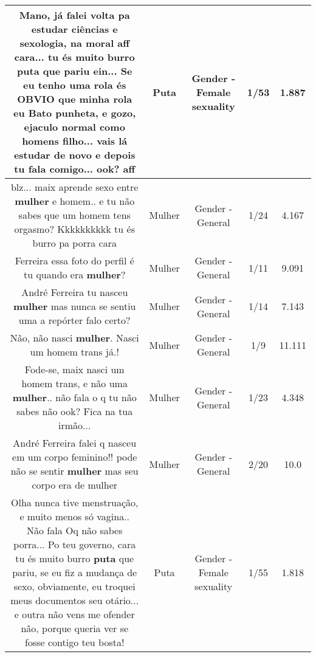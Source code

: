 \documentclass[11pt]{article}
\newlength\mylength
\begin{document}
\begin{center}
\begin{longtable}{|C{.65\mylength}|C{.30\mylength}|C{.12\mylength}|C{.12\mylength}|C{.12\mylength}|}
  \small Mano, já falei volta pa estudar ciências e sexologia, na moral aff cara... tu és muito burro \textbf{puta} que pariu ein... Se eu tenho uma rola és OBVIO que minha rola eu Bato punheta, e gozo, ejaculo normal como homens filho... vais lá estudar de novo e depois tu fala comigo... ook? aff\normalsize   & Puta & Gender - Female sexuality & 1/53 & 1.887 \\  \hline
  \small blz... maix aprende sexo entre \textbf{mulher} e homem..  e tu não sabes que um homem tens orgasmo? Kkkkkkkkkk tu és burro pa porra cara\normalsize   & Mulher & Gender - General & 1/24 & 4.167 \\  \hline
  \small {} Ferreira essa foto do perfil é tu quando era \textbf{mulher}?\normalsize   & Mulher & Gender - General & 1/11 & 9.091 \\  \hline
  \small André Ferreira tu nasceu \textbf{mulher} mas nunca se sentiu uma a repórter falo certo?\normalsize   & Mulher & Gender - General & 1/14 & 7.143 \\  \hline
  \small Não, não nasci \textbf{mulher}. Nasci um homem trans já.!\normalsize   & Mulher & Gender - General & 1/9 & 11.111 \\  \hline
  \small Fode-se, maix nasci um homem trans,  e não uma \textbf{mulher}.. não fala o q tu não sabes não ook? Fica na tua irmão...\normalsize   & Mulher & Gender - General & 1/23 & 4.348 \\  \hline
  \small André Ferreira falei q nasceu em um corpo feminino!! pode não se sentir \textbf{mulher} mas seu corpo era de mulher\normalsize   & Mulher & Gender - General & 2/20 & 10.0 \\  \hline
  \small Olha nunca tive menstruação, e muito menos só vagina.. Não fala Oq não sabes porra... Po teu governo, cara tu és muito burro \textbf{puta} que pariu, se eu fiz a mudança de sexo, obviamente, eu troquei meus documentos seu otário... e outra não vens me ofender não, porque queria ver se fosse contigo teu bosta!\normalsize   & Puta & Gender - Female sexuality & 1/55 & 1.818 \\  \hline

\end{longtable}
\end{center}
\end{document}
